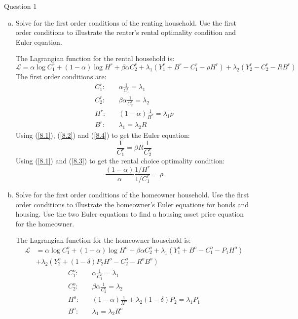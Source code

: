 \documentclass[a4paper]{article}
\begin{document}
\begin{questionbox}{Question 1}
\begin{enumerate}[(a)]
			\item Solve for the ﬁrst order conditions of the renting household. Use the ﬁrst order conditions to illustrate the renter's rental optimality condition and Euler equation.
			\begin{explanationbox}
				The Lagrangian function for the rental household is:
				\[
					\mathcal{L} = \alpha\log C_1^r + (1-\alpha)\log H^r + \beta\alpha C_2^r + \lambda_1(Y_1^r + B^r - C_1^r - \rho H^r) + \lambda_2(Y_2^r - C_2^r - RB^r)
				\]
				The first order conditions are:
				\begin{align}
					C_1^r:\quad &\alpha\frac{1}{C_1^r} = \lambda_1 \label{8.1}\\ 
					C_2^r:\quad &\beta\alpha\frac{1}{C_2^r} = \lambda_2 \label{8.2}\\ 
					H^r:\quad &(1-\alpha)\frac{1}{H^r} = \lambda_1\rho \label{8.3}\\ 
					B^r:\quad &\lambda_1 = \lambda_2 R \label{8.4}
				\end{align}
				Using (\ref{8.1}), (\ref{8.2}) and (\ref{8.4}) to get the Euler equation:
				\[
					\frac{1}{C_1^r} = \beta R \frac{1}{C_2^r}
				\]
				Using (\ref{8.1}) and (\ref{8.3}) to get the rental choice optimality condition:
				\[
					\frac{(1-\alpha)}{\alpha} \frac{1/H^r}{1/C^r_1} = \rho
				\]
			\end{explanationbox}
			\item Solve for the first order conditions of the homeowner household. Use the first order conditions to illustrate the homeowner's Euler equations for bonds and housing. Use the two Euler equations to find a housing asset price equation for the homeowner.
			\begin{explanationbox}
				The Lagrangian function for the homeowner household is:
				\begin{align*}
					\mathcal{L} &= \alpha\log C_1^o + (1-\alpha)\log H^o + \beta\alpha C_2^o + \lambda_1(Y_1^o + B^o - C_1^o - P_1 H^o)\\
					&+ \lambda_2(Y_2^o + (1-\delta)P_2H^o - C_2^o - R^oB^o)
				\end{align*}
				\begin{align}
					C_1^o:\quad &\alpha\frac{1}{C_1^o} = \lambda_1 \label{8.5}\\ 
					C_2^o:\quad &\beta\alpha\frac{1}{C_2^o} = \lambda_2 \label{8.6}\\ 
					H^o:\quad &(1-\alpha)\frac{1}{H^o}+\lambda_2(1-\delta)P_2 = \lambda_1 P_1 \label{8.7}\\ 
					B^o:\quad &\lambda_1 = \lambda_2 R^o \label{8.8}

\end{align}
\end{explanationbox}
\end{enumerate}
\end{questionbox}
\end{document}
